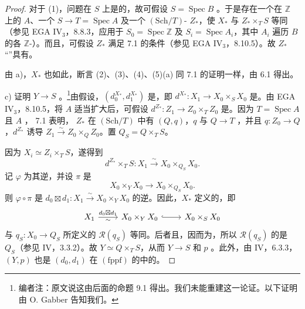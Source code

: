 \begin{proof}
对于 (1)，问题在 $S$ 上是的，故可假设 $S=\operatorname{Spec}B$ 。于是存在一个在 $\mathbb Z$ 上的 $A$、一个 $S\to T=\operatorname{Spec}A$ 及一个 $(\mathrm{Sch}/T)$- $Z_*$，使 $X_*$ 与 $Z_*\times_TS$ 等同（参见 EGA IV$_3$，8.8.3，应用于 $S_0=\operatorname{Spec}\mathbb Z$ 及 $S_i=\operatorname{Spec}A_i$，其中 $A_i$ 遍历 $B$ 的各 $\mathbb Z$-）。而且，可假设 $Z_*$ 满足 7.1 的条件（参见 EGA IV$_3$，8.10.5）。故 $Z_*$ “”具有。

由 a)，$X_*$ 也如此，断言 (2)、(3)、(4)、(5)(a) 同 7.1 的证明一样，由 6.1 得出。

c) 证明 $Y\to S$ 。\footnote{编者注：原文说这由后面的命题 9.1 得出。我们未能重建这一论证。以下证明由 O. Gabber 告知我们。}由假设，$(d_0^{X_*},d_1^{X_*})$ 是，即 $d^{X_*}:X_1\to X_0\times_SX_0$ 是。由 EGA IV$_3$，8.10.5，将 $A$ 适当扩大后，可假设 $d^{Z_*}:Z_1\to Z_0\times_TZ_0$ 是。因为 $T=\operatorname{Spec}A$ 且 $A$ ， 7.1 表明， $Z_*$ 在 $(\mathrm{Sch}/T)$ 中有 $(Q,q)$，$q$ 与 $Q\to T$ ，并且 $q:Z_0\to Q$ ，$d^{Z_*}$ 诱导 $Z_1\xrightarrow\sim Z_0\times_QZ_0$。置 $Q_S=Q\times_TS$。

因为 $X_i\simeq Z_i\times_TS$，遂得到
\[
d^{Z_*}\times_TS:X_1\xrightarrow\sim X_0\times_{Q_S}X_0.
\]
记 $\varphi$ 为其逆，并设 $\pi$ 是
\[
X_0\times_YX_0\longrightarrow X_0\times_{Q_S}X_0.
\]
则 $\varphi\circ\pi$ 是 $d_0\boxtimes d_1:X_1\xrightarrow\sim X_0\times_YX_0$ 的逆。因此，$X_*$ 定义的，即
\[
\begin{tikzcd}
X_1\arrow[r,"d_0\boxtimes d_1","\sim"']&X_0\times_YX_0\arrow[r,hook]&X_0\times_SX_0
\end{tikzcd}
\]
与 $q_S:X_0\to Q_S$ 所定义的 $\mathscr R(q_S)$ 等同。后者且，因而为，所以 $\mathscr R(q_S)$ 的是 $Q_S$（参见 IV，3.3.2）。故 $Y\simeq Q\times_TS$，从而 $Y\to S$ 和 $p$ 。此外，由 IV，6.3.3，$(Y,p)$ 也是 $(d_0,d_1)$ 在 $(\mathrm{fppf})$ 的中的。
\end{proof}

